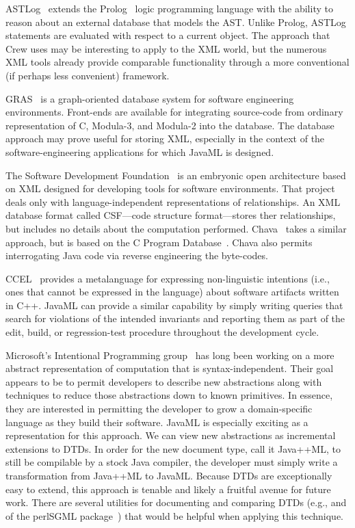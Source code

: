 \documentclass{article}
\begin{document}
\begin{multicols}{2}
ASTLog~\cite{Crew97} extends the Prolog~\cite{Clock94} logic programming
language with the ability to reason about an external database that
models the AST.  Unlike Prolog, ASTLog statements are evaluated with
respect to a current object.  The approach that Crew uses may be
interesting to apply to the XML world, but the numerous XML tools
already provide comparable functionality through a more conventional (if
perhaps less convenient) framework.

GRAS~\cite{Kiesel95} is a graph-oriented database system for software engineering
environments.  Front-ends are available for integrating source-code from
ordinary representation of C, Modula-3, and Modula-2 into the database.  The database 
approach may prove useful for storing XML, especially in the context of
the software-engineering applications for which JavaML is designed.

The Software Development Foundation~\cite{SDS} is an embryonic open
architecture based on XML designed for developing tools for software
environments.  That project deals only with language-independent
representations of relationships.  An XML database format called
CSF---code structure format---stores ther relationships, but includes no
details about the computation performed.  Chava~\cite{Chava} takes a
similar approach, but is based on the C Program Database~\cite{Chen89}.
Chava also permits interrogating Java code via reverse
engineering the byte-codes.

CCEL~\cite{CCEL92} provides a metalanguage for expressing non-linguistic
intentions (i.e., ones that cannot be expressed in the language) about
software artifacts written in C++.  JavaML can provide a similar
capability by simply writing queries that search for violations of the
intended invariants and reporting them as part of the edit, build, or
regression-test procedure throughout the development cycle.

Microsoft's Intentional Programming group~\cite{Simonyi96} has long been
working on a more abstract representation of computation that is
syntax-independent.  Their goal appears to be to permit developers to
describe new abstractions along with techniques to reduce those
abstractions down to known primitives.  In essence, they are interested
in permitting the developer to grow a domain-specific language as they
build their software.  JavaML is especially exciting as a representation
for this approach.  We can view new abstractions as incremental
extensions to DTDs.  In order for the new document type, call it
Java++ML, to still be compilable by a stock Java compiler, the developer
must simply write a transformation from Java++ML to JavaML.  Because
DTDs are exceptionally easy to extend, this approach is tenable and
likely a fruitful avenue for future work.  There are several utilities
for documenting and comparing DTDs (e.g.,  and
 of the perlSGML package~\cite{perlSGML}) that would
be helpful when applying this technique.



\end{multicols}
\end{document}
